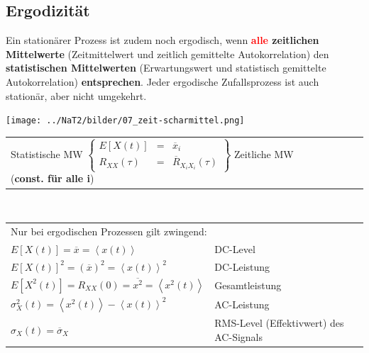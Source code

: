 
\subsection{Ergodizität }
Ein stationärer Prozess ist zudem noch ergodisch, wenn \textbf{\textcolor{red}{alle} zeitlichen
Mittelwerte} (Zeitmittelwert und zeitlich gemittelte Autokorrelation) den \textbf{statistischen
Mittelwerten} (Erwartungswert und statistisch gemittelte Autokorrelation)
\textbf{entsprechen}. Jeder ergodische Zufallsprozess ist auch stationär, aber
nicht umgekehrt.


	\begin{minipage}{5cm}
		\texttt{[image: ../NaT2/bilder/07\_zeit-scharmittel.png]}
  	\end{minipage}
	\begin{minipage}{13.5cm}
	\begin{tabular}{llll}  
    	Statistische MW $ \left\{
    	\begin{array}{ccc}
       		E[X(t)] & = & \overline{x}_i \\
       		R_{XX}(\tau) & = & \overline{R}_{X_iX_i}(\tau)
       \end{array}
		\right\} $
		Zeitliche MW (\textbf{const. für alle i})
    \end{tabular} \\

	\begin{tabular}{ll}
  		\multicolumn{2}{l}{Nur bei ergodischen Prozessen gilt zwingend:} \\
      $E[X(t)] = \overline{x} = \left\langle x(t) \right\rangle$ & DC-Level \\
      $E[X(t)]^{2} = (\overline{x})^{2} = \left\langle x(t) \right\rangle^{2}$ & DC-Leistung \\
      $E[X^{2}(t)] = R_{XX}(0) = \overline{x^{2}} = 
                     \left\langle x^{2}(t) \right\rangle $ & Gesamtleistung \\
      $\sigma_{X}^{2}(t) = \left\langle x^{2}(t) \right\rangle 
                           - \left\langle x(t) \right\rangle^{2}$ & AC-Leistung \\
      $\sigma_{X}(t) = \overline{\sigma}_{X}$ & RMS-Level (Effektivwert) des AC-Signals\\
    \end{tabular}
  	\end{minipage}


